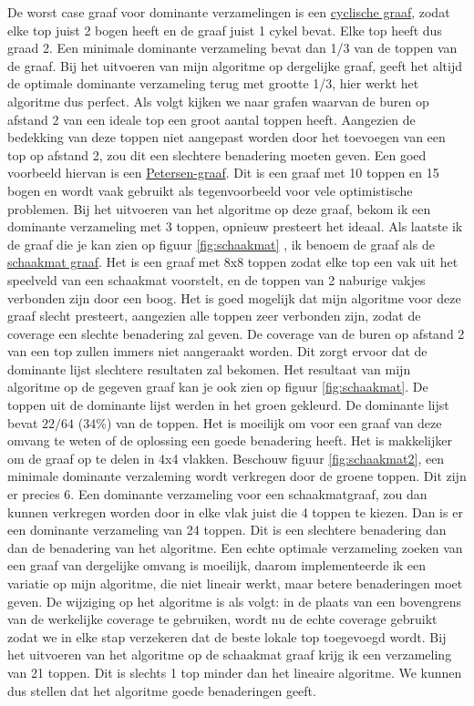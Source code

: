\documentclass[11pt, a4paper, table]{article}
\theoremstyle{definition}
\theoremstyle{definition}
\theoremstyle{definition}
\begin{document}
De worst case graaf voor dominante verzamelingen is een \underline{cyclische graaf}, zodat elke top juist 2 bogen heeft en de graaf juist 1 cykel bevat. 
Elke top heeft dus graad 2. Een minimale dominante verzameling bevat dan 1/3 van de toppen van de graaf. Bij het uitvoeren van mijn algoritme op dergelijke graaf, geeft het altijd de optimale dominante verzameling terug met grootte 1/3, hier werkt het algoritme dus perfect. 
Als volgt kijken we naar grafen waarvan de buren op afstand 2 van een ideale top een groot aantal toppen heeft. Aangezien de bedekking van deze toppen niet aangepast worden door het toevoegen van een top op afstand 2, zou dit een slechtere benadering moeten geven. Een goed voorbeeld hiervan is een \underline{Petersen-graaf}. Dit is een graaf met 10 toppen en 15 bogen en wordt vaak gebruikt als tegenvoorbeeld voor vele optimistische problemen. Bij het uitvoeren van het algoritme op deze graaf, bekom ik een dominante verzameling met 3 toppen, opnieuw presteert het ideaal. 
Als laatste ik de graaf die je kan zien op figuur \ref{fig:schaakmat}
, ik benoem de graaf als de \underline{schaakmat graaf}. Het is een graaf met 8x8 toppen zodat elke top een vak uit het speelveld van een schaakmat voorstelt, en de toppen van 2 naburige vakjes verbonden zijn door een boog. Het is goed mogelijk dat mijn algoritme voor deze graaf slecht presteert, aangezien alle toppen zeer verbonden zijn, zodat de coverage een slechte benadering zal geven. De coverage van de buren op afstand 2 van een top zullen immers niet aangeraakt worden. Dit zorgt ervoor dat de dominante lijst slechtere resultaten zal bekomen. Het resultaat van mijn algoritme op de gegeven graaf kan je ook zien op figuur \ref{fig:schaakmat}. De toppen uit de dominante lijst werden in het groen gekleurd. De dominante lijst bevat $22/64$ (34\%) van de toppen. Het is moeilijk om voor een graaf van deze omvang te weten of de oplossing een goede benadering heeft. Het is makkelijker om de graaf op te delen in 4x4 vlakken. Beschouw figuur \ref{fig:schaakmat2}, een minimale dominante verzaleming wordt verkregen door de groene toppen. Dit zijn er precies 6. 
Een dominante verzameling voor een schaakmatgraaf, zou dan kunnen verkregen worden door in elke vlak juist die 4 toppen te kiezen. Dan is er een dominante verzameling van 24 toppen. Dit is een slechtere benadering dan dan de benadering van het algoritme. Een echte optimale verzameling zoeken van een graaf van dergelijke omvang is moeilijk, daarom implementeerde ik een variatie op mijn algoritme, die niet lineair werkt, maar betere benaderingen moet geven. De wijziging op het algoritme is als volgt: in de plaats van een bovengrens van de werkelijke coverage te gebruiken, wordt nu de echte coverage gebruikt zodat we in elke stap verzekeren dat de beste lokale top toegevoegd wordt. Bij het uitvoeren van het algoritme op de schaakmat graaf krijg ik een verzameling van 21 toppen. Dit is slechts 1 top minder dan het lineaire algoritme. We kunnen dus stellen dat het algoritme goede benaderingen geeft. 
\end{document}

